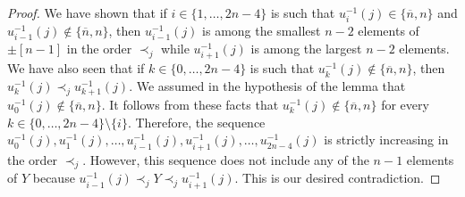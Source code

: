 \documentclass[10pt,a4paper]{amsart}
\begin{document}
\begin{proof}
We have shown that if $i\in\{1,\ldots,2n-4\}$ is such that $u_{i}^{-1}(j)\in\{\overline n,n\}$ and $u_{i-1}^{-1}(j)\not\in\{\overline n,n\}$, then $u_{i-1}^{-1}(j)$ is among the smallest $n-2$ elements of $\pm[n-1]$ in the order $\prec_j$ while $u_{i+1}^{-1}(j)$ is among the largest $n-2$ elements. We have also seen that if $k\in\{0,\ldots,2n-4\}$ is such that $u_k^{-1}(j)\not\in\{\overline n,n\}$, then $u_k^{-1}(j)\prec_j u_{k+1}^{-1}(j)$. We assumed in the hypothesis of the lemma that $u_0^{-1}(j)\not\in\{\overline n,n\}$. It follows from these facts that $u_k^{-1}(j)\not\in\{\overline n,n\}$ for every $k\in\{0,\ldots,2n-4\}\setminus\{i\}$. Therefore, the sequence $u_0^{-1}(j),u_1^{-1}(j),\ldots,u_{i-1}^{-1}(j),u_{i+1}^{-1}(j),\ldots,u_{2n-4}^{-1}(j)$ is strictly increasing in the order $\prec_j$. However, this sequence does not include any of the $n-1$ elements of $Y$ because $u_{i-1}^{-1}(j)\prec_j Y\prec_j u_{i+1}^{-1}(j)$. This is our desired contradiction. 
\end{proof}
\end{document}

